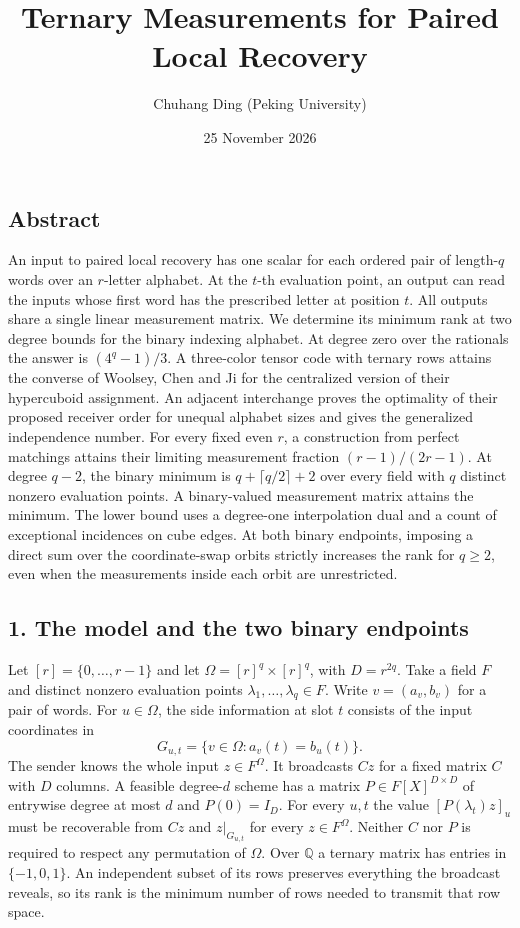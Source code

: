 \documentclass[
  10pt,
]{article}
\title{Ternary Measurements for Paired Local Recovery}
\author{Chuhang Ding (Peking University)}
\date{25 November 2026}
\begin{document}
\maketitle

\subsection{Abstract}\label{abstract}

An input to paired local recovery has one scalar for each ordered pair
of length-\(q\) words over an \(r\)-letter alphabet. At the \(t\)-th
evaluation point, an output can read the inputs whose first word has the
prescribed letter at position \(t\). All outputs share a single linear
measurement matrix. We determine its minimum rank at two degree bounds
for the binary indexing alphabet. At degree zero over the rationals the
answer is \((4^q-1)/3\). A three-color tensor code with ternary rows
attains the converse of Woolsey, Chen and Ji for the centralized version
of their hypercuboid assignment. An adjacent interchange proves the
optimality of their proposed receiver order for unequal alphabet sizes
and gives the generalized independence number. For every fixed even
\(r\), a construction from perfect matchings attains their limiting
measurement fraction \((r-1)/(2r-1)\). At degree \(q-2\), the binary
minimum is \(q+\lceil q/2\rceil+2\) over every field with \(q\) distinct
nonzero evaluation points. A binary-valued measurement matrix attains
the minimum. The lower bound uses a degree-one interpolation dual and a
count of exceptional incidences on cube edges. At both binary endpoints,
imposing a direct sum over the coordinate-swap orbits strictly increases
the rank for \(q\ge2\), even when the measurements inside each orbit are
unrestricted.

\subsection{1. The model and the two binary
endpoints}\label{the-model-and-the-two-binary-endpoints}

Let \([r]=\{0,\ldots,r-1\}\) and let \(\Omega=[r]^q\times[r]^q\), with
\(D=r^{2q}\). Take a field \(F\) and distinct nonzero evaluation points
\(\lambda_1,\ldots,\lambda_q\in F\). Write \(v=(a_v,b_v)\) for a pair of
words. For \(u\in\Omega\), the side information at slot \(t\) consists
of the input coordinates in \[
G_{u,t}=\{v\in\Omega:a_v(t)=b_u(t)\}.
\] The sender knows the whole input \(z\in F^\Omega\). It broadcasts
\(Cz\) for a fixed matrix \(C\) with \(D\) columns. A feasible
degree-\(d\) scheme has a matrix \(P\in F[X]^{D\times D}\) of entrywise
degree at most \(d\) and \(P(0)=I_D\). For every \(u,t\) the value
\([P(\lambda_t)z]_u\) must be recoverable from \(Cz\) and
\(z|_{G_{u,t}}\) for every \(z\in F^\Omega\). Neither \(C\) nor \(P\) is
required to respect any permutation of \(\Omega\). Over \(\mathbb Q\) a
ternary matrix has entries in \(\{-1,0,1\}\). An independent subset of
its rows preserves everything the broadcast reveals, so its rank is the
minimum number of rows needed to transmit that row space.
\end{document}
